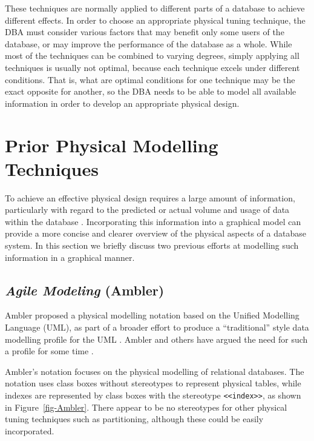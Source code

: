 \documentclass{CRPITStyle}
\begin{document}
These techniques are normally applied to different parts of a database
to achieve different effects. In order to choose an appropriate physical
tuning technique, the DBA must consider various factors that may benefit
only some users of the database, or may improve the performance of the
database as a whole. While most of the techniques can be combined to
varying degrees, simply applying all techniques is usually not optimal,
because each technique excels under different conditions. That is, what
are optimal conditions for one technique may be the exact opposite for
another, so the DBA needs to be able to model all available information
in order to develop an appropriate physical design.



\section{Prior Physical Modelling Techniques}
\label{sec-previous}

To achieve an effective physical design requires a large amount of
information, particularly with regard to the predicted or actual volume
and usage of data within the database \cite{BeDa-P-2003}. Incorporating
this information into a graphical model can provide a more concise and
clearer overview of the physical aspects of a database system. In this
section we briefly discuss two previous efforts at modelling such
information in a graphical manner.


\subsection{\emph{Agile Modeling} (Ambler)}

Ambler proposed a physical modelling notation based on the Unified
Modelling Language (UML), as part of a broader effort to produce a
``traditional'' style data modelling profile for the UML
\cite{Ambl-SW-2003-ADT,Ambl-SW-2004-ObjPrimer3}. Ambler and others have
argued the need for such a profile for some time
\cite{Ambl-SW-1998-BOA,Naib-EJ-2001-UMLDD}.

Ambler's notation focuses on the physical modelling of relational
databases. The notation uses class boxes without stereotypes to
represent physical tables, while indexes are represented by class boxes
with the stereotype \verb|<<index>>|, as shown in
Figure~\ref{fig-Ambler}. There appear to be no stereotypes for other
physical tuning techniques such as partitioning, although these could be
easily incorporated.
\end{document}
